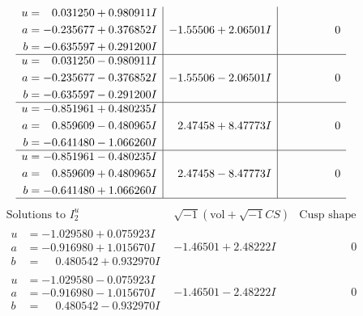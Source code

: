 \documentclass[1p]{elsarticle_modified}
\theoremstyle{definition}
\newcommand{\I}{\sqrt{-1}}
\begin{document}
$$\begin{array}{c|c|c}
\begin{aligned}
u &= \phantom{-}0.031250 + 0.980911 I \\
a &= -0.235677 + 0.376852 I \\
b &= -0.635597 + 0.291200 I\end{aligned}
 & -1.55506 + 2.06501 I & \phantom{-0.000000 } 0 \\ \hline\begin{aligned}
u &= \phantom{-}0.031250 - 0.980911 I \\
a &= -0.235677 - 0.376852 I \\
b &= -0.635597 - 0.291200 I\end{aligned}
 & -1.55506 - 2.06501 I & \phantom{-0.000000 } 0 \\ \hline\begin{aligned}
u &= -0.851961 + 0.480235 I \\
a &= \phantom{-}0.859609 - 0.480965 I \\
b &= -0.641480 - 1.066260 I\end{aligned}
 & \phantom{-}2.47458 + 8.47773 I & \phantom{-0.000000 } 0 \\ \hline\begin{aligned}
u &= -0.851961 - 0.480235 I \\
a &= \phantom{-}0.859609 + 0.480965 I \\
b &= -0.641480 + 1.066260 I\end{aligned}
 & \phantom{-}2.47458 - 8.47773 I & \phantom{-0.000000 } 0\\
 \hline 
 \end{array}$$\newpage$$\begin{array}{c|c|c}  
\text{Solutions to }I^u_{2}& \I (\text{vol} + \sqrt{-1}CS) & \text{Cusp shape}\\
 \hline 
\begin{aligned}
u &= -1.029580 + 0.075923 I \\
a &= -0.916980 + 1.015670 I \\
b &= \phantom{-}0.480542 + 0.932970 I\end{aligned}
 & -1.46501 + 2.48222 I & \phantom{-0.000000 } 0 \\ \hline\begin{aligned}
u &= -1.029580 - 0.075923 I \\
a &= -0.916980 - 1.015670 I \\
b &= \phantom{-}0.480542 - 0.932970 I\end{aligned}
 & -1.46501 - 2.48222 I & \phantom{-0.000000 } 0 \\ \hline\begin{aligned}

\end{aligned}
\end{array}$$
\end{document}
